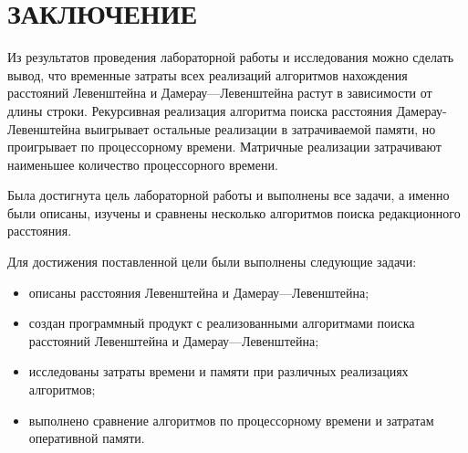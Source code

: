 \chapter*{ЗАКЛЮЧЕНИЕ}

Из результатов проведения лабораторной работы и исследования можно сделать вывод, что временные затраты всех реализаций алгоритмов нахождения расстояний Левенштейна и Дамерау---Левенштейна растут в зависимости от длины строки. Рекурсивная реализация алгоритма поиска расстояния Дамерау-Левенштейна выигрывает остальные реализации в затрачиваемой памяти, но проигрывает по процессорному времени. Матричные реализации затрачивают наименьшее количество процессорного времени.

Была достигнута цель лабораторной работы и выполнены все задачи, а именно были описаны, изучены и сравнены несколько алгоритмов поиска редакционного расстояния.

Для достижения поставленной цели были выполнены следующие задачи:
\begin{itemize}
	\item описаны расстояния Левенштейна и Дамерау---Левенштейна;
	\item создан программный продукт с реализованными алгоритмами поиска расстояний Левенштейна и Дамерау---Левенштейна;
	\item исследованы затраты времени и памяти при различных реализациях алгоритмов;
	\item выполнено сравнение алгоритмов по процессорному времени и затратам оперативной памяти.
\end{itemize}